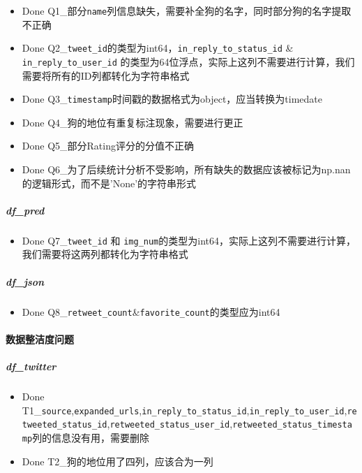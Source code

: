\documentclass[11pt]{article}
\providecommand{\tightlist}{%
      \setlength{\itemsep}{0pt}\setlength{\parskip}{0pt}}
\begin{document}
\begin{itemize}
\tightlist
\item
  Done
  Q1\_部分\texttt{name}列信息缺失，需要补全狗的名字，同时部分狗的名字提取不正确
\item
  Done
  Q2\_\texttt{tweet\_id}的类型为int64，\texttt{in\_reply\_to\_status\_id}
  \& \texttt{in\_reply\_to\_user\_id}
  的类型为64位浮点，实际上这列不需要进行计算，我们需要将所有的ID列都转化为字符串格式
\item
  Done
  Q3\_\texttt{timestamp}时间戳的数据格式为object，应当转换为timedate
\item
  Done Q4\_狗的地位有重复标注现象，需要进行更正
\item
  Done Q5\_部分Rating评分的分值不正确
\item
  Done
  Q6\_为了后续统计分析不受影响，所有缺失的数据应该被标记为np.nan的逻辑形式，而不是'None'的字符串形式
\end{itemize}

\hypertarget{df_pred}{%
\subparagraph{df\_pred}\label{df_pred}}

\begin{itemize}
\tightlist
\item
  Done Q7\_\texttt{tweet\_id} 和
  \texttt{img\_num}的类型为int64，实际上这列不需要进行计算，我们需要将这两列都转化为字符串格式
\end{itemize}

\hypertarget{df_json}{%
\subparagraph{df\_json}\label{df_json}}

\begin{itemize}
\tightlist
\item
  Done
  Q8\_\texttt{retweet\_count}\&\texttt{favorite\_count}的类型应为int64
\end{itemize}

\hypertarget{ux6570ux636eux6574ux6d01ux5ea6ux95eeux9898}{%
\paragraph{数据整洁度问题}\label{ux6570ux636eux6574ux6d01ux5ea6ux95eeux9898}}

\hypertarget{df_twitter-2}{%
\subparagraph{df\_twitter}\label{df_twitter-2}}

\begin{itemize}
\tightlist
\item
  Done
  T1\_\texttt{source},\texttt{expanded\_urls},\texttt{in\_reply\_to\_status\_id},\texttt{in\_reply\_to\_user\_id},\texttt{retweeted\_status\_id},\texttt{retweeted\_status\_user\_id},\texttt{retweeted\_status\_timestamp}列的信息没有用，需要删除
\item
  Done T2\_狗的地位用了四列，应该合为一列
\end{itemize}
\end{document}

